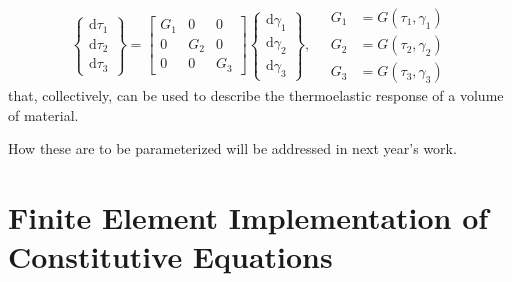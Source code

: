 \begin{displaymath}
    \left\{ \begin{matrix}
    \mathrm{d} \tau_1 \\ \mathrm{d} \tau_2 \\ \mathrm{d} \tau_3
    \end{matrix} \right\} = \begin{bmatrix}
    G_1 & 0 & 0 \\ 0 & G_2 & 0 \\ 0 & 0 & G_3
    \end{bmatrix} \left\{ \begin{matrix}
    \mathrm{d} \gamma_1 \\ \mathrm{d} \gamma_2 \\ \mathrm{d} \gamma_3
    \end{matrix} \right\} , \quad
    \begin{aligned}
    G_1 & = G ( \tau_1 , \gamma_1 ) \\
    G_2 & = G ( \tau_2 , \gamma_2 ) \\
    G_3 & = G ( \tau_3 , \gamma_3 )
    \end{aligned}
\end{displaymath}
that, collectively, can be used to describe the thermo\-elastic response of a volume of material.  

How these are to be parameterized will be addressed in next year's work.

\section{Finite Element Implementation of Constitutive Equations}
\label{secFE_CE}

